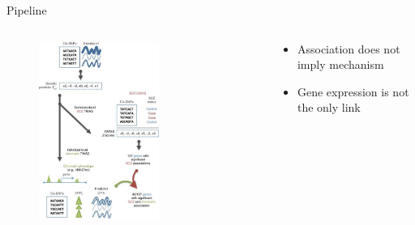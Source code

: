 \documentclass[aspectratio=169,12pt]{beamer}
\begin{document}

\begin{frame}{Pipeline}

	\begin{columns}
		\begin{column}{0.6\textwidth}
			\begin{figure}
				\includegraphics[width=0.63\textwidth]{gusev2018/1-TWAS_schematic_cropped}
			\end{figure}
		\end{column}

		\begin{column}{0.4\textwidth}
			\begin{itemize}
				\item Association does not imply mechanism
				\item Gene expression is not the only link
			\end{itemize}
		\end{column}
	\end{columns}


\end{frame}
\end{document}
